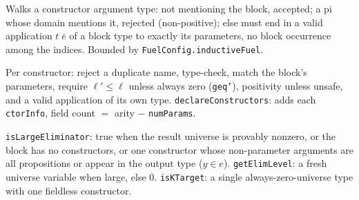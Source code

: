 \begin{definition}
\label{def:kernel-check-positivity}
\leanok
{}

 Walks a constructor argument type: not mentioning the block, accepted; a pi whose
domain mentions it, rejected (non-positive); else must end in a valid application $t\;\bar e$ of a
block type to exactly its parameters, no block occurrence among the indices. Bounded by
\texttt{FuelConfig.inductiveFuel}.
\end{definition}

\begin{definition}
\label{def:kernel-check-constructors}
\leanok
{}

 Per constructor: reject a duplicate name, type-check, match the block's
parameters, require $\ell' \le \ell$ unless always zero (\texttt{geq'}), positivity unless unsafe,
and a valid application of its own type. \texttt{declareConstructors}: adds each
\texttt{ctorInfo}, field count $=$ arity $-$ \texttt{numParams}.
\end{definition}

\begin{definition}
\label{def:kernel-large-elim}
\leanok
{}

 \texttt{isLargeEliminator}: true when the result universe is provably nonzero, or
the block has no constructors, or one constructor whose non-parameter arguments are all
propositions or appear in the output type ($y \in e$). \texttt{getElimLevel}: a fresh universe
variable when large, else $0$. \texttt{isKTarget}: a single always-zero-universe type with one
fieldless constructor.
\end{definition}

